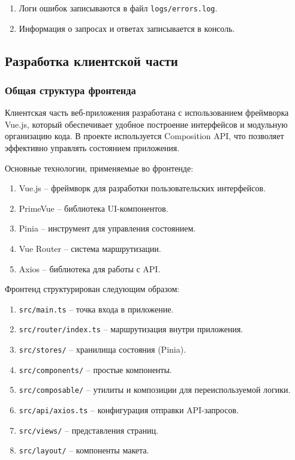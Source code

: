 \begin{enumerate}
\item Логи ошибок записываются в файл \texttt{logs/errors.log}.
\item Информация о запросах и ответах записывается в консоль.
\end{enumerate}

\subsection{Разработка клиентской части}

\subsubsection{Общая структура фронтенда}

Клиентская часть веб-приложения разработана с использованием фреймворка Vue.js, который обеспечивает удобное построение интерфейсов и модульную организацию кода.
В проекте используется Composition API, что позволяет эффективно управлять состоянием приложения.

Основные технологии, применяемые во фронтенде:
\begin{enumerate}
\item Vue.js -- фреймворк для разработки пользовательских интерфейсов.
\item PrimeVue -- библиотека UI-компонентов.
\item Pinia -- инструмент для управления состоянием.
\item Vue Router -- система маршрутизации.
\item Axios -- библиотека для работы с API.
\end{enumerate}

Фронтенд структурирован следующим образом:
\begin{enumerate}
\item \texttt{src/main.ts} -- точка входа в приложение.
\item \texttt{src/router/index.ts} -- маршрутизация внутри приложения.
\item \texttt{src/stores/} -- хранилища состояния (Pinia).
\item \texttt{src/components/} -- простые компоненты.
\item \texttt{src/composable/} -- утилиты и композиции для переиспользуемой логики.
\item \texttt{src/api/axios.ts} -- конфигурация отправки API-запросов.
\item \texttt{src/views/} -- представления страниц.
\item \texttt{src/layout/} -- компоненты макета.
\end{enumerate}

